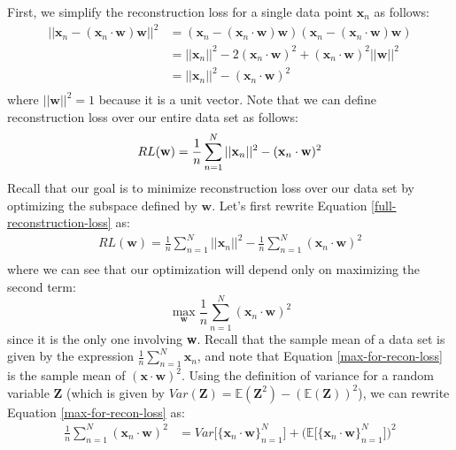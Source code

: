 First, we simplify the reconstruction loss for a single data point $\textbf{x}_n$ as follows:
\begin{align*}
	||\textbf{x}_{n} - (\textbf{x}_{n} \cdot \textbf{w})\textbf{w}||^{2} &= (\textbf{x}_{n} - (\textbf{x}_{n} \cdot \textbf{w})\textbf{w})(\textbf{x}_{n} - (\textbf{x}_{n} \cdot \textbf{w})\textbf{w}) \\
	&= ||\textbf{x}_{n}||^{2} - 2(\textbf{x}_{n} \cdot \textbf{w})^{2} + (\textbf{x}_{n} \cdot \textbf{w})^{2}||\textbf{w}||^{2} \\
	&= ||\textbf{x}_{n}||^{2} - (\textbf{x}_{n} \cdot \textbf{w})^{2} \\
\end{align*}
where $||\textbf{w}||^{2} = 1$ because it is a unit vector. Note that we can define reconstruction loss over our entire data set as follows:
\begin{equation} \label{full-reconstruction-loss}
    RL(\textbf{w}) = \frac{1}{n} \sum_{n=1}^{N} ||\textbf{x}_{n}||^{2} - (\textbf{x}_{n} \cdot \textbf{w})^{2} \\
\end{equation}
Recall that our goal is to minimize reconstruction loss over our data set by optimizing the subspace defined by $\textbf{w}$. Let's first rewrite Equation \ref{full-reconstruction-loss} as:
\begin{align*}
    RL(\textbf{w}) = \frac{1}{n} \sum_{n=1}^{N} ||\textbf{x}_{n}||^{2} - \frac{1}{n} \sum_{n=1}^{N} (\textbf{x}_{n} \cdot \textbf{w})^{2} \\
\end{align*}
where we can see that our optimization will depend only on maximizing the second term:
\begin{equation} \label{max-for-recon-loss}
    \max_{\textbf{w}} \frac{1}{n} \sum_{n=1}^{N} (\textbf{x}_{n} \cdot \textbf{w})^{2}
\end{equation}
since it is the only one involving \textbf{w}. Recall that the sample mean of a data set is given by the expression $\frac{1}{n} \sum_{n=1}^{N} \textbf{x}_{n}$, and note that Equation \ref{max-for-recon-loss} is the sample mean of $(\textbf{x} \cdot \textbf{w})^{2}$. Using the definition of variance for a random variable $\textbf{Z}$ (which is given by $Var(\textbf{Z}) = \mathbb{E}(\textbf{Z}^{2}) - (\mathbb{E}(\textbf{Z}))^{2}$), we can rewrite Equation \ref{max-for-recon-loss} as:
\begin{align*}
    \frac{1}{n} \sum_{n=1}^{N} (\textbf{x}_{n} \cdot \textbf{w})^{2} &= Var\big[\{\textbf{x}_{n} \cdot \textbf{w}\}_{n=1}^{N}\big] + \big( \mathbb{E} \big[\{\textbf{x}_{n} \cdot \textbf{w}\}_{n=1}^{N}\big] \big)^{2}
\end{align*}
